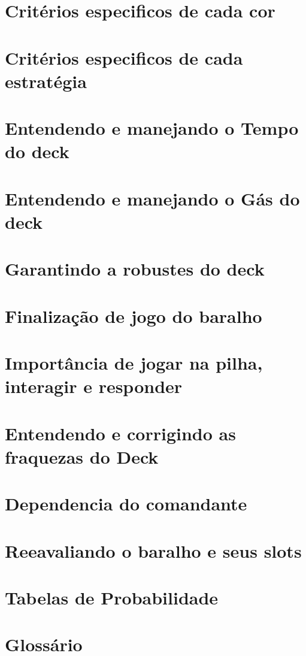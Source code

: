 \documentclass[12pt, a4paper]{article}
\begin{document}
    \section{Critérios especificos de cada cor}
     \pagebreak

    \section{Critérios especificos de cada estratégia}
     \pagebreak

    \section{Entendendo e manejando o Tempo do deck}
     \pagebreak

    \section{Entendendo e manejando o Gás do deck}
     \pagebreak

    \section{Garantindo a robustes do deck}
     \pagebreak

    \section{Finalização de jogo do baralho}
     \pagebreak

    \section{Importância de jogar na pilha, interagir e responder}
     \pagebreak

    \section{Entendendo e corrigindo as fraquezas do Deck}
     \pagebreak

    \section{Dependencia do comandante}
     \pagebreak

    \section{Reeavaliando o baralho e seus slots}
     \pagebreak

    \section{Tabelas de Probabilidade}
     \pagebreak

    \section{Glossário}
     \pagebreak

    
\end{document}
